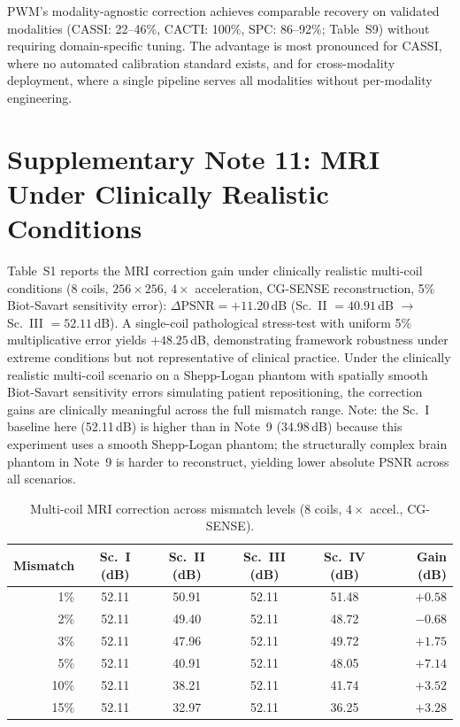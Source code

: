 \documentclass[11pt]{article}
\theoremstyle{definition}
\begin{document}
PWM's modality-agnostic correction achieves comparable recovery on validated modalities (CASSI: 22--46\%, CACTI: 100\%, SPC: 86--92\%; Table~S9) without requiring domain-specific tuning. The advantage is most pronounced for CASSI, where no automated calibration standard exists, and for cross-modality deployment, where a single pipeline serves all modalities without per-modality engineering.

\section{Supplementary Note 11: MRI Under Clinically Realistic Conditions}
\label{sec:mri_realistic}

Table~S1 reports the MRI correction gain under clinically realistic multi-coil conditions (8 coils, $256 \times 256$, $4\times$ acceleration, CG-SENSE reconstruction, 5\% Biot-Savart sensitivity error): $\Delta\mathrm{PSNR} = +11.20$\,dB (Sc.~II $= 40.91$\,dB $\to$ Sc.~III $= 52.11$\,dB). A single-coil pathological stress-test with uniform 5\% multiplicative error yields $+48.25$\,dB, demonstrating framework robustness under extreme conditions but not representative of clinical practice. Under the clinically realistic multi-coil scenario on a Shepp-Logan phantom with spatially smooth Biot-Savart sensitivity errors simulating patient repositioning, the correction gains are clinically meaningful across the full mismatch range.  Note: the Sc.~I baseline here (52.11\,dB) is higher than in Note~9 (34.98\,dB) because this experiment uses a smooth Shepp-Logan phantom; the structurally complex brain phantom in Note~9 is harder to reconstruct, yielding lower absolute PSNR across all scenarios.

\begin{table}[ht]
\centering\small
\caption{Multi-coil MRI correction across mismatch levels (8 coils, $4\times$ accel., CG-SENSE).}
\label{tab:mri_realistic}
\begin{tabular}{@{}rccccr@{}}
\toprule
Mismatch & Sc.~I (dB) & Sc.~II (dB) & Sc.~III (dB) & Sc.~IV (dB) & Gain (dB) \\
\midrule
1\%  & 52.11 & 50.91 & 52.11 & 51.48 & $+0.58$ \\
2\%  & 52.11 & 49.40 & 52.11 & 48.72 & $-0.68$ \\
3\%  & 52.11 & 47.96 & 52.11 & 49.72 & $+1.75$ \\
5\%  & 52.11 & 40.91 & 52.11 & 48.05 & $+7.14$ \\
10\% & 52.11 & 38.21 & 52.11 & 41.74 & $+3.52$ \\
15\% & 52.11 & 32.97 & 52.11 & 36.25 & $+3.28$ \\
\bottomrule
\end{tabular}
\end{table}
\end{document}
